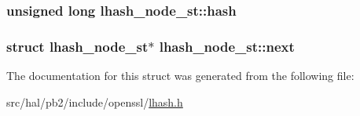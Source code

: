 \subsubsection[{\texorpdfstring{hash}{hash}}]{\setlength{\rightskip}{0pt plus 5cm}unsigned long lhash\+\_\+node\+\_\+st\+::hash}\hypertarget{structlhash__node__st_adae3442cad55dbd25659909f8f15ced7}{}\label{structlhash__node__st_adae3442cad55dbd25659909f8f15ced7}
\subsubsection[{\texorpdfstring{next}{next}}]{\setlength{\rightskip}{0pt plus 5cm}struct {\bf lhash\+\_\+node\+\_\+st}$\ast$ lhash\+\_\+node\+\_\+st\+::next}\hypertarget{structlhash__node__st_a9756db4182d64ae6212672d2d1cea695}{}\label{structlhash__node__st_a9756db4182d64ae6212672d2d1cea695}


The documentation for this struct was generated from the following file\+:\begin{DoxyCompactItemize}
\item 
src/hal/pb2/include/openssl/\hyperlink{lhash_8h}{lhash.\+h}\end{DoxyCompactItemize}
